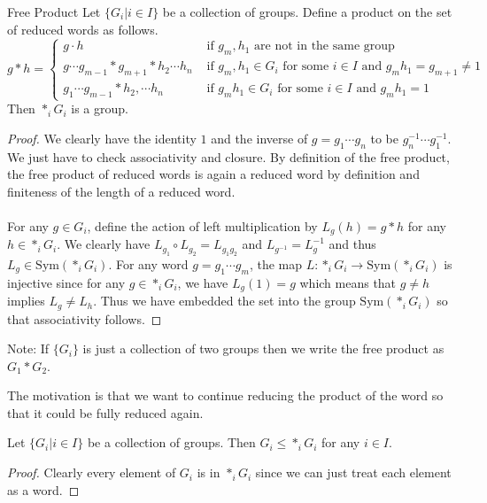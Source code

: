 \documentclass[a4paper]{article}
\begin{document}
\begin{prp}{Free Product}{} Let $\{G_i|i\in I\}$ be a collection of groups. Define a product on the set of reduced words as follows. $$g\ast h=\begin{cases}
g \cdot h & \text{ if $g_m,h_1$ are not in the same group }\\
g\cdots g_{m-1}\ast g_{m+1}\ast h_2\cdots h_n & \text{ if $g_m,h_1\in G_i$ for some $i\in I$ and $g_mh_1=g_{m+1}\neq 1$}\\
g_1\cdots g_{m-1}\ast h_2,\cdots h_n & \text{ if $g_mh_1\in G_i$ for some $i\in I$ and $g_mh_1=1$}
\end{cases}$$
Then $\ast_iG_i$ is a group. \tcbline
\begin{proof}
We clearly have the identity $1$ and the inverse of $g=g_1\cdots g_n$ to be $g_n^{-1}\cdots g_1^{-1}$. We just have to check associativity and closure. By definition of the free product, the free product of reduced words is again a reduced word by definition and finiteness of the length of a reduced word. \\~\\
For any $g\in G_i$, define the action of left multiplication by $L_g(h)=g\ast h$ for any $h\in\ast_iG_i$. We clearly have $L_{g_1}\circ L_{g_2}=L_{g_1g_2}$ and $L_{g^{-1}}=L_g^{-1}$ and thus $L_g\in\text{Sym}(\ast_iG_i)$. For any word $g=g_1\cdots g_m$, the map $L:\ast_iG_i\to\text{Sym}(\ast_iG_i)$ is injective since for any $g\in\ast_iG_i$, we have $L_g(1)=g$ which means that $g\neq h$ implies $L_g\neq L_h$. Thus we have embedded the set into the group $\text{Sym}(\ast_iG_i)$ so that associativity follows. 
\end{proof}
\end{prp}

Note: If $\{G_i\}$ is just a collection of two groups then we write the free product as $G_1\ast G_2$. 

The motivation is that we want to continue reducing the product of the word so that it could be fully reduced again. 
\begin{prp}{}{} Let $\{G_i|i\in I\}$ be a collection of groups. Then $G_i\leq\ast_iG_i$ for any $i\in I$. \tcbline
\begin{proof}
Clearly every element of $G_i$ is in $\ast_iG_i$ since we can just treat each element as a word. 
\end{proof}
\end{prp}
\end{document}

